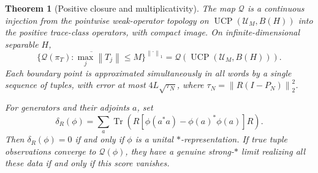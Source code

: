 \documentclass[11pt,a4paper]{amsart}
\numberwithin{equation}{section}
\newtheorem{theorem}{Theorem}[section]
\theoremstyle{definition}
\theoremstyle{remark}
\DeclareMathOperator{\UCP}{UCP}
\DeclareMathOperator{\Tr}{Tr}
\newcommand{\norm}[1]{\left\lVert#1\right\rVert}
\begin{document}
\begin{theorem}[Positive closure and multiplicativity]\label{thm:ucp}
The map $\mathcal Q$ is a continuous injection from the pointwise weak-operator topology on $\UCP(\mathcal U_M,B(H))$ into the positive trace-class operators, with compact image. On infinite-dimensional separable $H$,
\begin{equation}\label{eq:ucpclosure}
 \overline{\{\mathcal Q(\pi_T):\max_j\norm{T_j}\le M\}}^{\norm\cdot_1}
 =\mathcal Q(\UCP(\mathcal U_M,B(H))).
\end{equation}
Each boundary point is approximated simultaneously in all words by a single sequence of tuples, with error at most $4L\sqrt{\tau_N}$, where $\tau_N=\norm{R(I-P_N)}_2^2$.

For generators and their adjoints $a$, set
\begin{equation}\label{eq:schwarzscore}
 \delta_R(\phi)=\sum_a\Tr\left(R[\phi(a^*a)-\phi(a)^*\phi(a)]R\right).
\end{equation}
Then $\delta_R(\phi)=0$ if and only if $\phi$ is a unital $*$-representation. If true tuple observations converge to $\mathcal Q(\phi)$, they have a genuine strong-$*$ limit realizing all these data if and only if this score vanishes.
\end{theorem}
\end{document}
